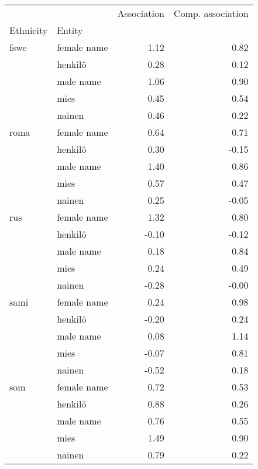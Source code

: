 \begin{tabular}{llrr}
\toprule
    &        &  Association &  Comp. association \\
Ethnicity & Entity &              &                    \\
\midrule
fswe & female name &         1.12 &               0.82 \\
    & henkilö &         0.28 &               0.12 \\
    & male name &         1.06 &               0.90 \\
    & mies &         0.45 &               0.54 \\
    & nainen &         0.46 &               0.22 \\
roma & female name &         0.64 &               0.71 \\
    & henkilö &         0.30 &              -0.15 \\
    & male name &         1.40 &               0.86 \\
    & mies &         0.57 &               0.47 \\
    & nainen &         0.25 &              -0.05 \\
rus & female name &         1.32 &               0.80 \\
    & henkilö &        -0.10 &              -0.12 \\
    & male name &         0.18 &               0.84 \\
    & mies &         0.24 &               0.49 \\
    & nainen &        -0.28 &              -0.00 \\
sami & female name &         0.24 &               0.98 \\
    & henkilö &        -0.20 &               0.24 \\
    & male name &         0.08 &               1.14 \\
    & mies &        -0.07 &               0.81 \\
    & nainen &        -0.52 &               0.18 \\
som & female name &         0.72 &               0.53 \\
    & henkilö &         0.88 &               0.26 \\
    & male name &         0.76 &               0.55 \\
    & mies &         1.49 &               0.90 \\
    & nainen &         0.79 &               0.22 \\
\bottomrule
\end{tabular}
